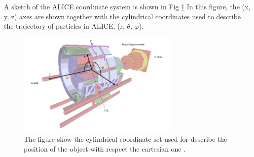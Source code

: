 \documentclass[12pt,a4paper]{book}
\begin{document}
	A sketch of the ALICE coordinate system is shown in Fig \ref{fig:ALICE_cordinates} In this figure, the (x, y, z) axes are shown together with the cylindrical coordinates used to describe the trajectory of particles in ALICE, (r, $\theta$, $\varphi$).
	\begin{figure}[h]
		\centering
		\includegraphics[width=0.7\textwidth]{pictures/ALICE_cordinates.png}
		\caption{The figure show the cylindrical coordinate set used for describe the position of the object with respect the cartesian one \cite{Herrmann:2920632}.}
		\label{fig:ALICE_cordinates}
	\end{figure}
	
\end{document}
